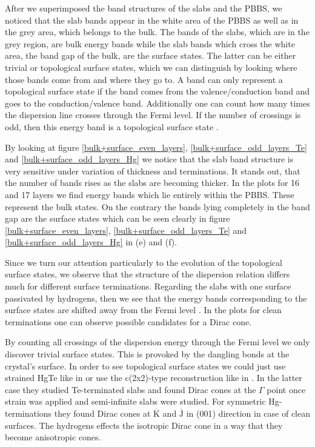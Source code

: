 	After we superimposed the band structures of the slabs and the PBBS, we noticed that the slab bands appear in the white area of the PBBS as well as in the grey area, which belongs to the bulk. 
	The bands of the slabs, which are in the grey region, are bulk energy bands while the slab bands which cross the white area, the band gap of the bulk, are the surface states. The latter can be either trivial or topological surface states, which we can distinguish by looking where those bands come from and where they go to. A band can only represent a topological surface state if the band comes from the valence/conduction band and goes to the conduction/valence band. 
	Additionally one can count how many times the dispersion line crosses through the Fermi level. If the number of crossings is odd, then this energy band is a topological surface state \cite{Bansil}.
	
	By looking at figure \ref{bulk+surface_even_layers}, \ref{bulk+surface_odd_layers_Te} and \ref{bulk+surface_odd_layers_Hg} we notice that the slab band structure is very sensitive under variation of thickness and terminations. It stands out, that the number of bands rises as the slabs are becoming thicker. In the plots for 16 and 17 layers we find energy bands which lie entirely within the PBBS. These represent the bulk states. On the contrary the bands lying completely in the band gap are the surface states which can be seen clearly in figure \ref{bulk+surface_even_layers}, \ref{bulk+surface_odd_layers_Te} and \ref{bulk+surface_odd_layers_Hg} in (e) and (f). 
	
	Since we turn our attention particularly to the evolution of the topological surface states, we observe that the structure of the dispersion relation differs much for different surface terminations. 
	Regarding the slabs with one surface passivated by hydrogens, then we see that the energy bands corresponding to the surface states are shifted away from the Fermi level \cite{top_surf_states}. In the plots for clean terminations one can observe possible candidates for a Dirac cone.
	
	By counting all crossings of the dispersion energy through the Fermi level we only discover trivial surface states. This is provoked by the dangling bonds at the crystal's surface. 
	In order to see topological surface states we could just use strained HgTe like in \cite{HgTe_structure_001} or use the c(2x2)-type reconstruction like in \cite{top_surf_states}. In the latter case they studied Te-terminated slabs and found Dirac cones at the $\Gamma$ point once strain was applied and semi-infinite slabs were studied. For symmetric Hg-terminations they found Dirac cones at $\overline{\text{K}}$ and $\overline{\text{J}}$ in (001) direction in case of clean surfaces. 
	The hydrogens effects the isotropic Dirac cone in a way that they become anisotropic cones.  
	
